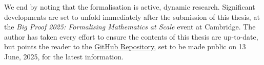 We end by noting that the formalisation is active, dynamic research. Significant developments are set to unfold immediately after the submission of this thesis, at the \textit{Big Proof 2025: Formalising Mathematics at Scale} event at Cambridge. The author has taken every effort to ensure the contents of this thesis are up-to-date, but points the reader to the \href{https://github.com/thefundamentaltheor3m/Sphere-Packing-Lean}{GitHub Repository}, set to be made public on 13 June, 2025, for the latest information.

\begin{comment}
    Given the limitations of the M4R assessed project paradigm, the author decided, at the very beginning, to use the first three sections of Viazovska's paper as a black box in order to reduce the number-theoretic burden on what already stood ahead of me as a daunting formalisation task. In particular, the author chose not to make this M4R a number theory project with an element of formalisation but a formalisation project involving ideas from number theory and complex analysis. This conscious but deliberate decision illustrates one of the many advantages of formal theorem proving: modularity with assurances. That is, one need not understand the entirety of a project to contribute to it: one simply needs to understand the parts one is formalising and how to use other ideas and results to one's end. In particular, the fact that the results one is using are formalised provides one with the assurance (that would otherwise only come with expertise) that those results are, indeed, correct. By bearing in mind the subtle yet immensely important fact that this project, at its core, is not a number theory project but a formalisation project, the reader will better understand the expository choices made by the author over the course of this report. There will be less emphasis on the motivations for constructing Viazovska's magic function in this manner (for there exist numerous excellent expository articles that explain this in detail \cite{a few things}) and more emphasis on the formalisation process, with reflections on the successes and failures of the formalisation strategies employed. We underscore insights gleaned from doing this that were not evident in the paper, one one occasion even identifying a small (but negligible) error that was published in the Annals. 
\end{comment}
